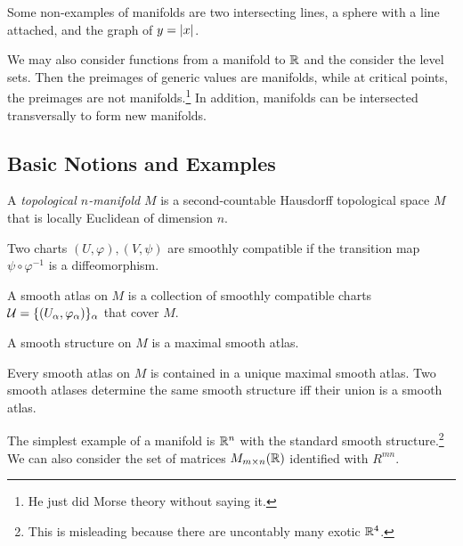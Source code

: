 \documentclass[twoside, 10pt]{article}
\begin{document}
    \begin{exm}
        Some non-examples of manifolds are two intersecting lines, a sphere with a line attached, and the graph of $y = \lvert x\rvert$.
    \end{exm}

    We may also consider functions from a manifold to $\mathbb{R}$ and the consider the level sets. Then the preimages of generic values are manifolds, while at critical points, the preimages are not manifolds.\footnote{He just did Morse theory without saying it.} In addition, manifolds can be intersected transversally to form new manifolds.

    \subsection{Basic Notions and Examples}%
    \label{sub:basic_notions_and_examples}
    
    
    \begin{defn}
        A \textit{topological $n$-manifold} $M$ is a second-countable Hausdorff topological space $M$ that is locally Euclidean of dimension $n$.
    \end{defn}

    \begin{defn}
        Two charts $(U, \varphi), (V, \psi)$ are smoothly compatible if the transition map $\psi \circ \varphi^{-1}$ is a diffeomorphism.
    \end{defn}

    \begin{defn}
        A smooth atlas on $M$ is a collection of smoothly compatible charts $\mathcal{U} = \{(U_{\alpha}, \varphi_{\alpha})\}_{\alpha}$ that cover $M$.
    \end{defn}

    \begin{defn}
        A smooth structure on $M$ is a maximal smooth atlas.
    \end{defn}

    \begin{lem}
        Every smooth atlas on $M$ is contained in a unique maximal smooth atlas. Two smooth atlases determine the same smooth structure iff their union is a smooth atlas.
    \end{lem}

    \begin{exm}
        The simplest example of a manifold is $\mathbb{R}^n$ with the standard smooth structure.\footnote{This is misleading because there are uncontably many exotic $\mathbb{R}^4$.} We can also consider the set of matrices $M_{m \times n}(\mathbb{R})$ identified with $R^{mn}$.
    \end{exm}
\end{document}

